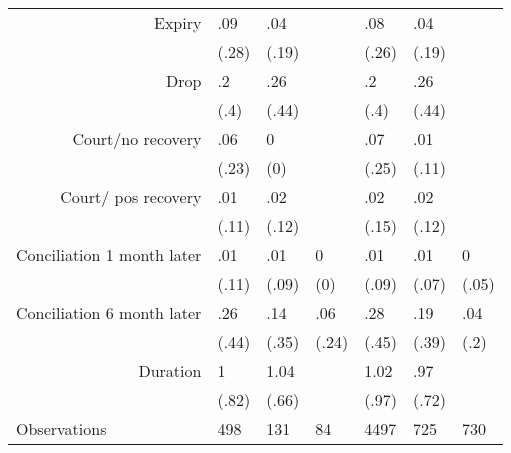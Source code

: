 \begin{tabular}{rrrrrrr}
Expiry & \multicolumn{1}{l}{.09} & \multicolumn{1}{l}{.04} & \multicolumn{1}{l}{} & \multicolumn{1}{l}{.08} & \multicolumn{1}{l}{.04} & \multicolumn{1}{l}{} \\
      & \multicolumn{1}{l}{(.28)} & \multicolumn{1}{l}{(.19)} & \multicolumn{1}{l}{} & \multicolumn{1}{l}{(.26)} & \multicolumn{1}{l}{(.19)} & \multicolumn{1}{l}{} \\
Drop  & \multicolumn{1}{l}{.2} & \multicolumn{1}{l}{.26} & \multicolumn{1}{l}{} & \multicolumn{1}{l}{.2} & \multicolumn{1}{l}{.26} & \multicolumn{1}{l}{} \\
      & \multicolumn{1}{l}{(.4)} & \multicolumn{1}{l}{(.44)} & \multicolumn{1}{l}{} & \multicolumn{1}{l}{(.4)} & \multicolumn{1}{l}{(.44)} & \multicolumn{1}{l}{} \\
Court/no recovery & \multicolumn{1}{l}{.06} & \multicolumn{1}{l}{0} & \multicolumn{1}{l}{} & \multicolumn{1}{l}{.07} & \multicolumn{1}{l}{.01} & \multicolumn{1}{l}{} \\
      & \multicolumn{1}{l}{(.23)} & \multicolumn{1}{l}{(0)} & \multicolumn{1}{l}{} & \multicolumn{1}{l}{(.25)} & \multicolumn{1}{l}{(.11)} & \multicolumn{1}{l}{} \\
Court/ pos recovery & \multicolumn{1}{l}{.01} & \multicolumn{1}{l}{.02} & \multicolumn{1}{l}{} & \multicolumn{1}{l}{.02} & \multicolumn{1}{l}{.02} & \multicolumn{1}{l}{} \\
      & \multicolumn{1}{l}{(.11)} & \multicolumn{1}{l}{(.12)} & \multicolumn{1}{l}{} & \multicolumn{1}{l}{(.15)} & \multicolumn{1}{l}{(.12)} & \multicolumn{1}{l}{} \\
Conciliation 1 month later & \multicolumn{1}{l}{.01} & \multicolumn{1}{l}{.01} & \multicolumn{1}{l}{0} & \multicolumn{1}{l}{.01} & \multicolumn{1}{l}{.01} & \multicolumn{1}{l}{0} \\
      & \multicolumn{1}{l}{(.11)} & \multicolumn{1}{l}{(.09)} & \multicolumn{1}{l}{(0)} & \multicolumn{1}{l}{(.09)} & \multicolumn{1}{l}{(.07)} & \multicolumn{1}{l}{(.05)} \\
Conciliation 6 month later & \multicolumn{1}{l}{.26} & \multicolumn{1}{l}{.14} & \multicolumn{1}{l}{.06} & \multicolumn{1}{l}{.28} & \multicolumn{1}{l}{.19} & \multicolumn{1}{l}{.04} \\
      & \multicolumn{1}{l}{(.44)} & \multicolumn{1}{l}{(.35)} & \multicolumn{1}{l}{(.24)} & \multicolumn{1}{l}{(.45)} & \multicolumn{1}{l}{(.39)} & \multicolumn{1}{l}{(.2)} \\
Duration & \multicolumn{1}{l}{1} & \multicolumn{1}{l}{1.04} & \multicolumn{1}{l}{} & \multicolumn{1}{l}{1.02} & \multicolumn{1}{l}{.97} & \multicolumn{1}{l}{} \\
      & \multicolumn{1}{l}{(.82)} & \multicolumn{1}{l}{(.66)} & \multicolumn{1}{l}{} & \multicolumn{1}{l}{(.97)} & \multicolumn{1}{l}{(.72)} & \multicolumn{1}{l}{} \\
      \bottomrule
\multicolumn{1}{l}{Observations} & \multicolumn{1}{l}{498} & \multicolumn{1}{l}{131} & \multicolumn{1}{l}{84} & \multicolumn{1}{l}{4497} & \multicolumn{1}{l}{725} & \multicolumn{1}{l}{730} \\
\bottomrule
\bottomrule
\end{tabular}%
